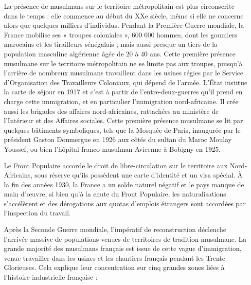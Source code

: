 La présence de musulmans sur le territoire métropolitain est plus
circonscrite dans le temps : elle commence au début du XXe siècle, même
si elle ne concerne alors que quelques milliers d'individus. Pendant la
Première Guerre mondiale, la France mobilise ses « troupes coloniales »,
600 000 hommes, dont les goumiers marocains et les tirailleurs
sénégalais ; mais aussi presque un tiers de la population masculine
algérienne âgée de 20 à 40 ans. Cette première présence musulmane sur le
territoire métropolitain ne se limite pas aux troupes, puisqu'à
l'arrière de nombreux musulmans travaillent dans les usines régies par
le Service d'Organisation des Travailleurs Coloniaux, qui dépend de
l'armée. L'État institue la carte de séjour en 1917 et c'est à partir de
l'entre-deux-guerres qu'il prend en charge cette immigration, et en
particulier l'immigration nord-africaine. Il crée aussi les brigades des
affaires nord-africaines, rattachées au ministère de l'Intérieur et des
Affaires sociales. Cette première présence musulmane se lit par quelques
bâtiments symboliques, tels que la Mosquée de Paris, inaugurée par le
président Gaston Doumergue en 1926 aux côtés du sultan du Maroc Moulay
Youssef, ou bien l'hôpital franco-musulman Avicenne à Bobigny en 1925.

Le Front Populaire accorde le droit de libre-circulation sur le
territoire aux Nord- Africains, sous réserve qu'ils possèdent une carte
d'identité et un visa spécial. À la fin des années 1930, la France a un
solde naturel négatif et le pays manque de main d'œuvre, si bien qu'à la
chute du Front Populaire, les naturalisations s'accélèrent et des
dérogations aux quotas d'emplois étrangers sont accordées par
l'inspection du travail.



Après la Seconde Guerre mondiale, l'impératif de reconstruction
déclenche l'arrivée massive de populations venues de territoires de
tradition musulmane. La grande majorité des musulmans français est issue
de cette vague d'immigration, venue travailler dans les usines et les
chantiers français pendant les Trente Glorieuses. Cela explique leur
concentration sur cinq grandes zones liées à l'histoire industrielle
française :



